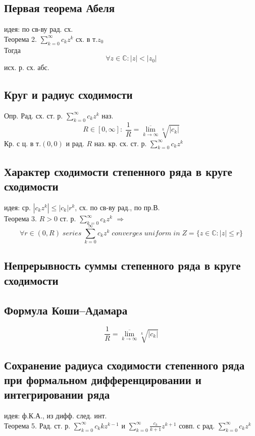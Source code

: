 \documentclass{article}
\begin{document}
\subsection{Первая теорема Абеля}
идея: по св-ву рад. сх. \\
Теорема 2. $\sum_{k=0}^\infty c_k z^k$ сх. в т.$z_0$ \\
Тогда
\begin{equation*}
    \forall z \in \mathbb C: |z| < |z_0|
\end{equation*}
исх. р. сх. абс.
\subsection{Круг и радиус сходимости}
Опр. Рад. сх. ст. р. $\sum_{k=0}^\infty c_k z^k$ наз.
\begin{equation*}
    R \in [0, \infty]: \; \frac{1}{R} = \underset{k \rightarrow \infty}{\overline{\lim}} \sqrt[k]{|c_k|}
\end{equation*}
Кр. с ц. в т.$(0,0)$ и рад. $R$ наз. кр. сх. ст. р. $\sum_{k=0}^\infty c_k z^k$
\subsection{Характер сходимости степенного ряда в круге сходимости}
идея: ср. $|c_k z^k| \leq |c_k| r^k$, сх. по св-ву рад., по пр.В.\\
Теорема 3. $R>0$ ст. р. $\sum_{k=0}^\infty c_k z^k$ $\Rightarrow$
\begin{equation*}
    \forall r \in (0, R) \; series \; \sum_{k=0}^\infty c_k z^k \; converges \; uniform \; in \; Z = \{ z \in \mathbb C: |z| \leq r \}
\end{equation*}
\subsection{Непрерывность суммы степенного ряда в круге сходимости}
\subsection{Формула Коши–Адамара}
\begin{equation*}
    \frac{1}{R} = \underset{k \rightarrow \infty}{\overline{\lim}} \sqrt[k]{|c_k|}
\end{equation*}
\subsection{Сохранение радиуса сходимости степенного ряда при формальном дифференцировании и интегрировании ряда}
идея: ф.К.А., из дифф. след. инт. \\
Теорема 5. Рад. ст. р. $\sum_{k=0}^\infty c_k k z^{k-1}$ и $\sum_{k=0}^\infty \frac{c_k}{k+1} z^{k+1}$ совп. с рад. $\sum_{k=0}^\infty c_k z^k$
\end{document}
